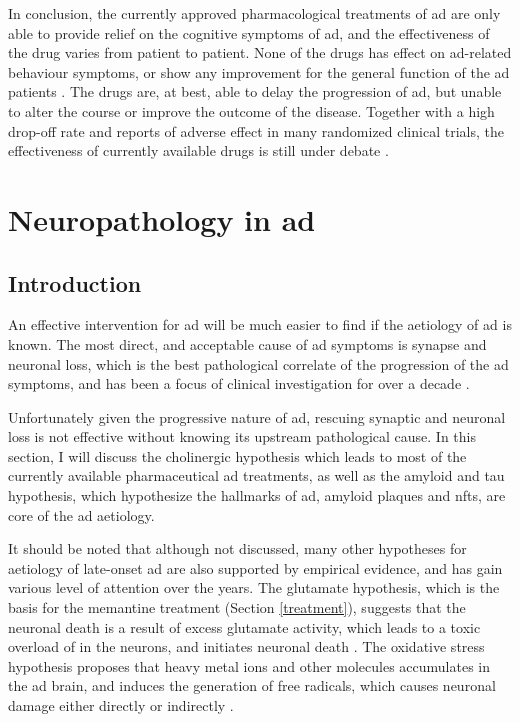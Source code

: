 In conclusion, the currently approved pharmacological treatments of \gls{ad} are only able to provide relief on the cognitive symptoms of \gls{ad}, and the effectiveness of the drug varies from patient to patient. None of the drugs has effect on \gls{ad}-related behaviour symptoms, or show any improvement for the general function of the \gls{ad} patients \citep{tan14}. The drugs are, at best, able to delay the progression of \gls{ad}, but unable to alter the course or improve the outcome of the disease. Together with a high drop-off rate and reports of adverse effect in many randomized clinical trials, the effectiveness of currently available drugs is still under debate \citep{bond12}. 


\section{Neuropathology in \gls{ad}}
\subsection{Introduction}
An effective intervention for \gls{ad} will be much easier to find if the aetiology of \gls{ad} is known. The most direct, and acceptable cause of \gls{ad} symptoms is synapse and neuronal loss, which is the best pathological correlate of the progression of the \gls{ad} symptoms, and has been a focus of clinical investigation for over a decade \citep{selkoe02, coleman04}. 

Unfortunately given the progressive nature of \gls{ad}, rescuing synaptic and neuronal loss is not effective without knowing its upstream pathological cause. In this section, I will discuss the cholinergic hypothesis which leads to most of the currently available pharmaceutical \gls{ad} treatments, as well as the amyloid and tau hypothesis, which hypothesize the hallmarks of \gls{ad}, amyloid plaques and \glspl{nft}, are core of the \gls{ad} aetiology. 

It should be noted that although not discussed, many other hypotheses for aetiology of late-onset \gls{ad} are also supported by empirical evidence, and has gain various level of attention over the years. The glutamate hypothesis, which is the basis for the memantine treatment (Section \ref{treatment}), suggests that the neuronal death is a result of excess glutamate activity, which leads to a toxic overload of  in the neurons, and initiates neuronal death \citep{greenamyre88, parsons07}. The oxidative stress hypothesis proposes that heavy metal ions and other molecules accumulates in the \gls{ad} brain, and induces the generation of free radicals, which causes neuronal damage either directly or indirectly \citep{markesbery97, smith10}. 

